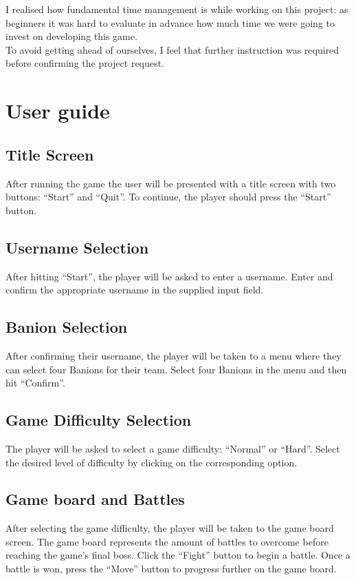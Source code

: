 \documentclass[12pt, a4paper]{report}
\theoremstyle{definition}
\begin{document}
    I realised how fundamental time management is while working on this project: as beginners it was hard to evaluate in advance how much time we
    were going to invest on developing this game.\\
    To avoid getting ahead of ourselves, I feel that further instruction was required before confirming the project request.

\appendix

\chapter{User guide}

\section{Title Screen}
After running the game the user will be presented with a title screen with two buttons: ``Start'' and ``Quit''. To continue, the player should press the ``Start'' button.

\section{Username Selection}
After hitting ``Start'', the player will be asked to enter a username. Enter and confirm the appropriate username in the supplied input field.

\section{Banion Selection}
After confirming their username, the player will be taken to a menu where they can select four Banions for their team.
Select four Banions in the menu and then hit ``Confirm''.

\section{Game Difficulty Selection}
The player will be asked to select a game difficulty: ``Normal'' or ``Hard''. Select the desired level of difficulty by clicking on the corresponding option.

\section{Game board and Battles}
After selecting the game difficulty, the player will be taken to the game board screen. The game board represents the amount of battles to overcome before reaching the game's final boss.
Click the ``Fight'' button to begin a battle. Once a battle is won, press the ``Move'' button to progress further on the game board.
\end{document}
